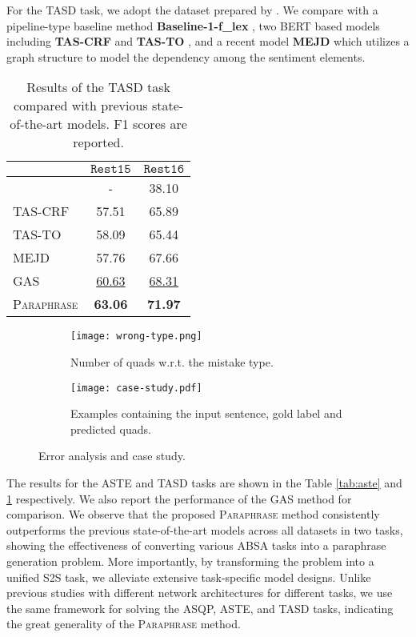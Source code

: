\documentclass[11pt]{article}
\begin{document}
For the TASD task, we adopt the dataset prepared by \citet{aaai20-tasd}. We compare with a pipeline-type baseline method \textbf{Baseline-1-f\_lex} \cite{tasd-baseline}, two BERT based models including \textbf{TAS-CRF} and \textbf{TAS-TO} \cite{aaai20-tasd}, and a recent model \textbf{MEJD} \cite{kbs21-mejd-tasd} which utilizes a graph structure to model the dependency among the sentiment elements.


\begin{table}[!t]
    \centering
    \resizebox{0.85\columnwidth}{!}
    {
    \begin{tabular}{lcc}
    \toprule
    & $\mathtt{Rest15}$ & $\mathtt{Rest16}$\\
    \midrule
    \citet{tasd-baseline}  & - & 38.10     \\
    TAS-CRF  \cite{aaai20-tasd}    & 57.51 & 65.89 \\
    TAS-TO   \cite{aaai20-tasd}    & 58.09 & 65.44 \\
    MEJD    \cite{kbs21-mejd-tasd}      & 57.76 & 67.66 \\
    \midrule
    GAS & \underline{60.63} & \underline{68.31} \\
    \textsc{Paraphrase} & \textbf{63.06} & \textbf{71.97} \\
    \bottomrule
    \end{tabular}}
    \caption{Results of the TASD task compared with previous state-of-the-art models. F1 scores are reported.} 
    \label{tab:tasd}
\end{table}


\begin{figure*}
     \centering
     \begin{subfigure}[b]{0.35\textwidth}
         \centering
         \texttt{[image: wrong-type.png]}
         \caption{Number of quads w.r.t. the mistake type.}
         \label{error-sentiment-type}
     \end{subfigure}\begin{subfigure}[b]{0.65\textwidth}
         \centering
         \texttt{[image: case-study.pdf]}
         \caption{Examples containing the input sentence, gold label and predicted quads.}
         \label{case-study}
     \end{subfigure}
     \caption{Error analysis and case study.}
     \label{graph-relations}
     \vspace{-0.3cm}
\end{figure*}


The results for the ASTE and TASD tasks are shown in the Table \ref{tab:aste} and \ref{tab:tasd} respectively. We also report the performance of the GAS method for comparison. We observe that the proposed \textsc{Paraphrase} method consistently outperforms the previous state-of-the-art models across all datasets in two tasks, showing the effectiveness of converting various ABSA tasks into a paraphrase generation problem. 
More importantly, by transforming the problem into a unified S2S task, we alleviate extensive task-specific model designs. Unlike previous studies with different network architectures for different tasks, we use the same framework for solving the ASQP, ASTE, and TASD tasks, indicating the great generality of the \textsc{Paraphrase} method.
\end{document}
